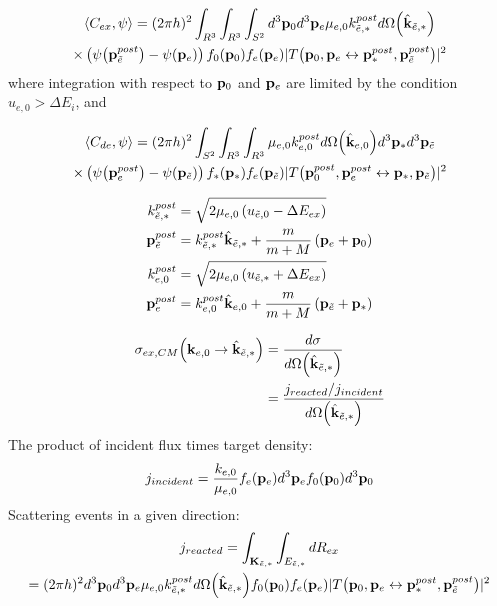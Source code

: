 \documentclass{article}[draft]
\begin{document}
\begin{multline*}
\left< C_{ex}, \psi \right> = 
(2\pi h)^2 
\int_{R^3} \int_{R^3} 
\int_{S^2}
d^3 \vect{p}_0 d^3 \vect{p}_e
\mu_{e,0} k_{\te,*}^{post} d \Omega\of{\hat{\vect{k}}_{\te,*}}
\\
\times
\left( \psi\of{\vect{p}_\te^{post}} - \psi\of{\vect{p}_e} \right) 
f_0\of{\vect{p}_0} f_e\of{\vect{p}_e} 
| T\of{\vect{p}_0, \vect{p}_e \leftrightarrow \vect{p}_*^{post}, \vect{p}_\te^{post}} |^2
\end{multline*}
where integration with respect to $\mathbf{p}_0$ and $\mathbf{p}_e$ are limited by the condition $u_{e,0} > \Delta E_i$, and

\begin{multline*}
\left< C_{de}, \psi \right> = 
(2\pi h)^2 
\int_{S^2}
\int_{R^3} \int_{R^3}
\mu_{e,0} k_{e,0}^{post} d \Omega\of{\hat{\vect{k}}_{e,0}}
d^3 \vect{p}_* d^3 \vect{p}_\te  
\\
\times
\left( \psi\of{\vect{p}_e^{post}} - \psi\of{\vect{p}_\te} \right) 
f_*\of{\vect{p}_*} f_e\of{\vect{p}_\te} 
| T\of{\vect{p}_0^{post}, \vect{p}_e^{post} \leftrightarrow \vect{p}_*, \vect{p}_\te} |^2
\end{multline*}

\begin{align*}
k_{{\tilde{e}},*}^{post} &= \sqrt{2 \mu_{e,0} \left( u_{{\tilde{e}},0} - \Delta E_{ex} \right)}
\\
\mathbf{p}_{\tilde{e}}^{post} &= k_{{\tilde{e}},*}^{post} \hat{\mathbf{k}}_{{\tilde{e}},*} + \frac{m}{m+M} \left( \mathbf{p}_e + \mathbf{p}_0 \right)
\\
k_{e,0}^{post} &= \sqrt{2 \mu_{e,0} \left( u_{{\tilde{e}},*} + \Delta E_{ex} \right)}
\\
\mathbf{p}_e^{post} &= k_{e,0}^{post} \hat{\mathbf{k}}_{e,0} + \frac{m}{m+M} \left( \mathbf{p}_{\tilde{e}} + \mathbf{p}_* \right)
\end{align*}


\begin{align*}
\sigma_{ex,CM} \of{ \vect{k}_{e,0} \rightarrow \hat{\vect{k}}_{\te,*}} 
&= \frac{d\sigma}{d\Omega\of{\hat{\vect{k}}_{\te,*}}}
\\
&= \frac{j_{reacted}/j_{incident}}{d\Omega\of{\hat{\vect{k}}_{\te,*}}}
\end{align*}
The product of incident flux times target density:
\begin{align*}
j_{incident} = \frac{k_{e,0}}{\mu_{e,0}} f_e\of{\vect{p}_e} d^3 \vect{p}_e f_0\of{\vect{p}_0} d^3 \vect{p}_0
\end{align*}
Scattering events in a given direction:
\begin{multline*}
j_{reacted} = \int_{\vect{K}_{\te,*}} \int_{E_{\te,*}} d R_{ex}
\\
= (2\pi h)^2 
d^3 \vect{p}_0 d^3 \vect{p}_e
\mu_{e,0} k_{\te,*}^{post} d \Omega\of{\hat{\vect{k}}_{\te,*}}
f_0\of{\vect{p}_0} f_e\of{\vect{p}_e} 
| T\of{\vect{p}_0, \vect{p}_e \leftrightarrow \vect{p}_*^{post}, \vect{p}_\te^{post}} |^2
\end{multline*}
\end{document}
